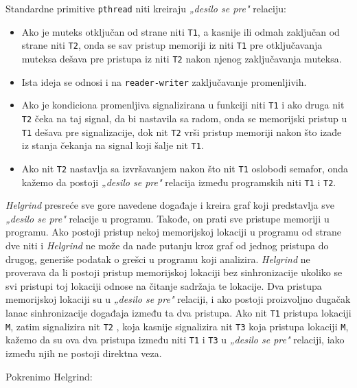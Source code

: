Standardne primitive \texttt{pthread} niti kreiraju \emph{„desilo se pre"} relaciju:

\begin{itemize}
\item
  Ako je muteks otključan od strane niti \texttt{T1}, a kasnije ili odmah zaključan od strane niti \texttt{T2}, onda se sav pristup memoriji iz niti \texttt{T1} pre otključavanja muteksa dešava pre pristupa iz niti \texttt{T2} nakon njenog zaključavanja muteksa.
\item
  Ista ideja se odnosi i na \texttt{reader-writer} zaključavanje promenljivih.
\item
  Ako je kondiciona promenljiva signalizirana u funkciji niti \texttt{T1} i ako druga nit \texttt{T2} čeka na taj signal, da bi nastavila sa radom, onda se memorijski pristup u \texttt{T1} dešava pre signalizacije, dok nit \texttt{T2} vrši pristup memoriji nakon što izađe iz stanja čekanja na signal koji šalje nit \texttt{T1}.
\item
  Ako nit \texttt{T2} nastavlja sa izvršavanjem nakon što nit \texttt{T1} oslobodi semafor, onda kažemo da postoji \emph{„desilo se pre"} relacija između programskih niti \texttt{T1} i \texttt{T2}.
\end{itemize}

\emph{Helgrind} presreće sve gore navedene događaje i kreira graf koji predstavlja sve \emph{„desilo se pre"} relacije u programu. Takođe, on prati sve pristupe memoriji u programu. Ako postoji pristup nekoj memorijskoj lokaciji u programu od strane dve niti i \emph{Helgrind} ne može da nađe putanju kroz graf od jednog pristupa do drugog, generiše podatak o grešci u programu koji analizira. \emph{Helgrind} ne proverava da li postoji pristup memorijskoj lokaciji bez sinhronizacije ukoliko se svi pristupi toj lokaciji odnose na čitanje sadržaja te lokacije. Dva pristupa memorijskoj lokaciji su u \emph{„desilo se pre"} relaciji, i ako postoji proizvoljno dugačak lanac sinhronizacije događaja između ta dva pristupa. Ako nit \texttt{T1} pristupa lokaciji \texttt{M}, zatim signalizira nit \texttt{T2} , koja kasnije signalizira nit \texttt{T3} koja pristupa lokaciji \texttt{M}, kažemo da su ova dva pristupa između niti \texttt{T1} i \texttt{T3} u \emph{„desilo se pre"} relaciji, iako između njih ne postoji direktna veza.

Pokrenimo Helgrind:

